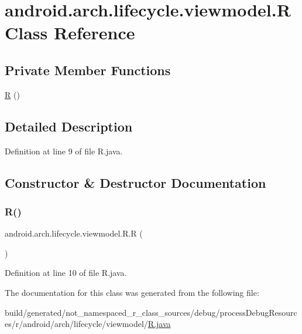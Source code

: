 \hypertarget{classandroid_1_1arch_1_1lifecycle_1_1viewmodel_1_1_r}{}\section{android.\+arch.\+lifecycle.\+viewmodel.\+R Class Reference}
\label{classandroid_1_1arch_1_1lifecycle_1_1viewmodel_1_1_r}
\subsection*{Private Member Functions}
\begin{DoxyCompactItemize}
\item 
\mbox{\hyperlink{classandroid_1_1arch_1_1lifecycle_1_1viewmodel_1_1_r_ae31c7fd717cb03006af7d18aaa68dab8}{R}} ()
\end{DoxyCompactItemize}


\subsection{Detailed Description}


Definition at line 9 of file R.\+java.



\subsection{Constructor \& Destructor Documentation}
\mbox{\label{classandroid_1_1arch_1_1lifecycle_1_1viewmodel_1_1_r_ae31c7fd717cb03006af7d18aaa68dab8}} 
\subsubsection{\texorpdfstring{R()}{R()}}
{\footnotesize\ttfamily android.\+arch.\+lifecycle.\+viewmodel.\+R.\+R (\begin{DoxyParamCaption}{ }\end{DoxyParamCaption})\hspace{0.3cm}{\ttfamily [private]}}



Definition at line 10 of file R.\+java.


\begin{DoxyCode}{0}

\end{DoxyCode}


The documentation for this class was generated from the following file\+:\begin{DoxyCompactItemize}
\item 
build/generated/not\+\_\+namespaced\+\_\+r\+\_\+class\+\_\+sources/debug/process\+Debug\+Resources/r/android/arch/lifecycle/viewmodel/\mbox{\hyperlink{android_2arch_2lifecycle_2viewmodel_2_r_8java}{R.\+java}}\end{DoxyCompactItemize}
